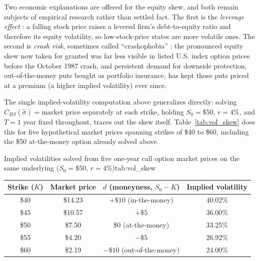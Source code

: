 \documentclass[../ai_in_finance]{subfiles}
\begin{document}
Two economic explanations are offered for the equity skew, and both remain subjects of empirical research rather than settled fact. The first is the \emph{leverage effect} \parencite{black1976studies}: a falling stock price raises a levered firm's debt-to-equity ratio and therefore its equity volatility, so low-stock-price states are more volatile ones. The second is \emph{crash risk}, sometimes called ``crashophobia'' \parencite{rubinstein1994implied}: the pronounced equity skew now taken for granted was far less visible in listed U.S. index option prices before the October 1987 crash, and persistent demand for downside protection, out-of-the-money puts bought as portfolio insurance, has kept those puts priced at a premium (a higher implied volatility) ever since.

\label{sec:vol-skew-example}

The single implied-volatility computation above generalizes directly: solving $C_{BS}(\hat\sigma) = \text{market price}$ separately at each strike, holding $S_0=\$50$, $r=4\%$, and $T=1$ year fixed throughout, traces out the skew itself. Table~\ref{tab:vol_skew} does this for five hypothetical market prices spanning strikes of \$40 to \$60, including the \$50 at-the-money option already solved above.

\begin{booktable}[htbp]{Implied volatilities solved from five one-year call option market prices on the same underlying ($S_0=\$50$, $r=4\%$)}{tab:vol_skew}
\begin{tabular}{cccc}
\toprule
Strike ($K$) & Market price & $d$ (moneyness, $S_0-K$) & Implied volatility \\
\midrule
\$40 & \$14.23 & $+\$10$ (in-the-money)      & 40.02\% \\
\$45 & \$10.57 & $+\$5$                        & 36.00\% \\
\$50 & \$7.50  & \$0 (at-the-money)            & 33.25\% \\
\$55 & \$4.20  & $-\$5$                        & 26.92\% \\
\$60 & \$2.19  & $-\$10$ (out-of-the-money)    & 24.00\% \\
\bottomrule
\end{tabular}
\end{booktable}
\end{document}
